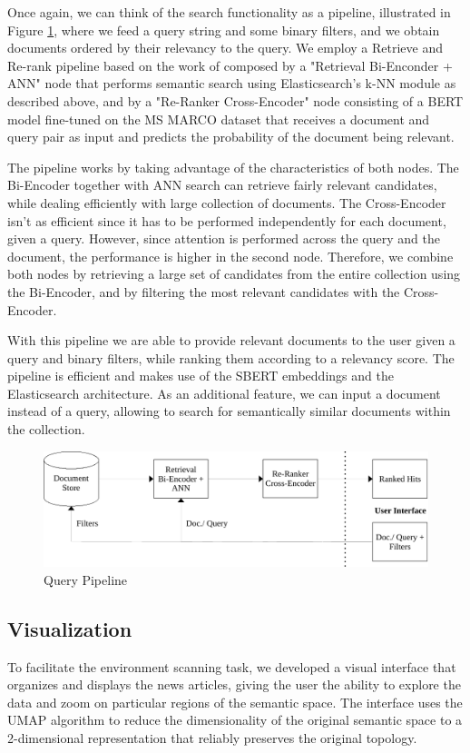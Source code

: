 \documentclass[a4paper]{article}
\begin{document}
Once again, we can think of the search functionality as a pipeline, illustrated in Figure \ref{query_pipeline}, where we feed a query string and some binary filters, and we obtain documents ordered by their relevancy to the query. We employ a Retrieve and Re-rank pipeline based on the work of \citet{nogueira2020a, kratzwald2019} composed by a "Retrieval Bi-Enconder + ANN" node that performs semantic search using Elasticsearch’s k-NN module as described above, and by a "Re-Ranker Cross-Encoder" node consisting of a BERT \citep{devlin2019} model fine-tuned on the MS MARCO dataset that receives a document and query pair as input and predicts the probability of the document being relevant. 

The pipeline works by taking advantage of the characteristics of both nodes. The Bi-Encoder together with ANN search can retrieve fairly relevant candidates, while dealing efficiently with large collection of documents. The Cross-Encoder isn't as efficient since it has to be performed independently for each document, given a query. However, since attention is performed across the query and the document, the performance is higher in the second node. Therefore, we combine both nodes by retrieving a large set of candidates from the entire collection using the Bi-Encoder, and by filtering the most relevant candidates with the Cross-Encoder.

With this pipeline we are able to provide relevant documents to the user given a query and binary filters, while ranking them according to a relevancy score. The pipeline is efficient and makes use of the SBERT embeddings and the Elasticsearch architecture. As an additional feature, we can input a document instead of a query, allowing to search for semantically similar documents within the collection.

\begin{figure}[H]
	\centering
	\includegraphics[scale=0.7]{./figures/query_pipeline}
	\caption{Query Pipeline}
	\label{query_pipeline}
\end{figure}

\subsection*{Visualization}
To facilitate the environment scanning task, we developed a visual interface that organizes and displays the news articles, giving the user the ability to explore the data and zoom on particular regions of the semantic space. The interface uses the UMAP \citep{mcinnes2020} algorithm to reduce the dimensionality of the original semantic space to a 2-dimensional representation that reliably preserves the original topology.
\end{document}
